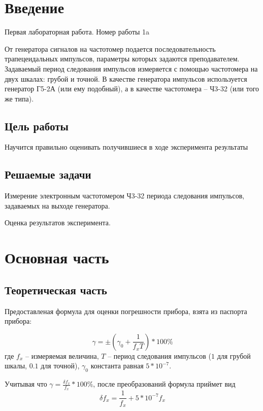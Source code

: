 \section{Введение}
Первая лабораторная работа. Номер работы 1a

От генератора сигналов на частотомер подается последовательность
трапецеидальных импульсов, параметры которых задаются преподавателем.
Задаваемый период следования импульсов измеряется с помощью
частотомера на двух шкалах: грубой и точной. В качестве генератора
импульсов используется генератор Г5-2А (или ему подобный), а в качестве
частотомера – Ч3-32 (или того же типа).

\subsection{Цель работы}

Научится правильно оценивать получившиеся в ходе эксперимента результаты

\subsection{Решаемые задачи}

Измерение электронным частотомером Ч3-32 периода следования импульсов, задаваемых на выходе генератора.

Оценка результатов эксперимента.

\section{Основная часть}

\subsection{Теоретическая часть}

Предоставленая формула для оценки погрешности прибора, взята из паспорта прибора: 

\begin{equation}
    \gamma=\pm(\gamma_0 +\frac{1}{f_x T})*100\%
    \label{error:tool_source}
\end{equation}
где $f_x$ -- измеряемая величина, $T$ -- период следования импульсов ($1$ для грубой шкалы, $0.1$ для точной), $\gamma_0$ константа равная $5*10^{-7}$.

Учитывая что $\gamma = \frac{\delta f_x}{f_x}*100\%$, после преобразований формула приймет вид
\begin{equation}
    \delta f_x = \frac{1}{f_x} + 5 * 10^{-7} f_x
    \label{error:tool_trans}
\end{equation}

